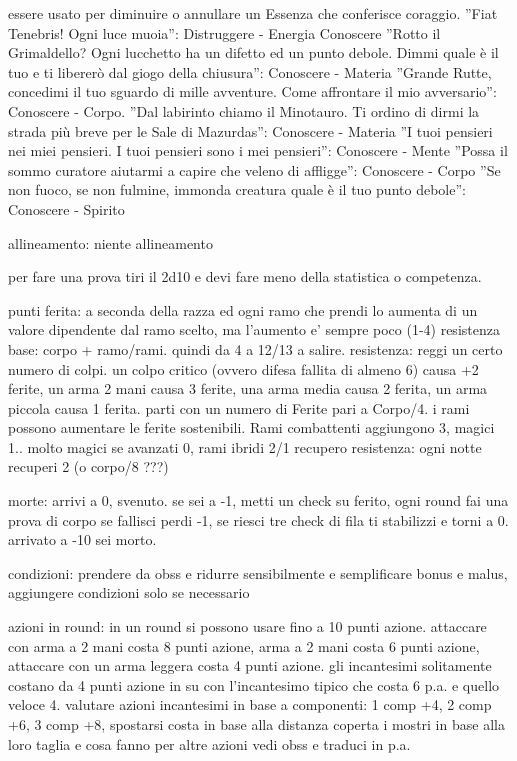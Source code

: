 \documentclass[12pt,a4paper,twoside,openany,twocolumn]{book}
\begin{document}
essere usato per diminuire o annullare un Essenza che conferisce coraggio. ”Fiat Tenebris! Ogni luce muoia”:
Distruggere - Energia
Conoscere
”Rotto il Grimaldello? Ogni lucchetto ha un difetto ed un punto debole. Dimmi quale è il tuo e ti libererò
dal giogo della chiusura”: Conoscere - Materia
”Grande Rutte, concedimi il tuo sguardo di mille avventure. Come affrontare il mio avversario”: Conoscere -
Corpo.
”Dal labirinto chiamo il Minotauro. Ti ordino di dirmi la strada più breve per le Sale di Mazurdas”: Conoscere
- Materia
”I tuoi pensieri nei miei pensieri. I tuoi pensieri sono i mei pensieri”: Conoscere - Mente
”Possa il sommo curatore aiutarmi a capire che veleno di affligge”: Conoscere - Corpo
”Se non fuoco, se non fulmine, immonda creatura quale è il tuo punto debole”: Conoscere - Spirito



allineamento: niente allineamento


per fare una prova tiri il 2d10 e devi fare meno della statistica o competenza. 


punti ferita: a seconda della razza ed ogni ramo che prendi lo aumenta di un valore dipendente dal ramo scelto, ma l'aumento e' sempre poco (1-4)
resistenza base: corpo + ramo/rami. quindi da 4 a 12/13 a salire. 
resistenza:  reggi un certo numero di colpi. un colpo critico (ovvero difesa fallita di almeno 6) causa +2 ferite, un arma 2 mani causa 3 ferite, una arma media causa 2 ferita, un arma piccola causa 1 ferita.
parti con un numero di Ferite pari a Corpo/4. i rami possono aumentare le ferite sostenibili. 
Rami combattenti aggiungono 3, magici 1.. molto magici se avanzati 0, rami ibridi 2/1
recupero resistenza: ogni notte recuperi 2 (o corpo/8 ???)

morte: arrivi a 0, svenuto. se sei a -1, metti un check su ferito, ogni round fai una prova di corpo se fallisci perdi -1, se riesci tre check di fila ti stabilizzi e torni a 0. arrivato a -10 sei morto.

condizioni: prendere da obss e ridurre sensibilmente  e semplificare bonus e malus, aggiungere condizioni solo se necessario

azioni in round: in un round si possono usare fino a 10 punti azione. attaccare con arma a 2 mani costa 8 punti azione, arma a 2 mani costa 6 punti azione, attaccare con un arma leggera costa 4 punti azione. gli incantesimi solitamente costano da 4 punti azione in su con l'incantesimo tipico che costa 6 p.a. e quello veloce 4. valutare azioni incantesimi in base a componenti: 1 comp +4, 2 comp +6, 3 comp +8, spostarsi costa in base alla distanza coperta
i mostri in base alla loro taglia e cosa fanno
per altre azioni vedi obss e traduci in p.a.
\end{document}
